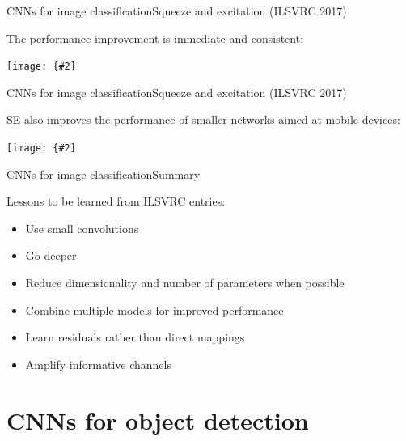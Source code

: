 \documentclass[aspectratio=169]{beamer}
\newcommand{\myfig}[3]{\centerline{\texttt{[image: \{\#2]}}}
\begin{document}
\begin{frame}{CNNs for image classification}{Squeeze and excitation (ILSVRC 2017)}

  The performance improvement is immediate and consistent:

  \medskip
  
  \myfig{4.5in}{hu-fig4}{Hu, Shen, and Sun (2018), Fig.\ 4}
  
\end{frame}


\begin{frame}{CNNs for image classification}{Squeeze and excitation (ILSVRC 2017)}

  SE also improves the performance of smaller networks aimed at mobile
  devices:

  \medskip
  
  \myfig{4in}{hu-table3}{Hu, Shen, and Sun (2018), Table 3}
  
\end{frame}


\begin{frame}{CNNs for image classification}{Summary}

  Lessons to be learned from ILSVRC entries:
  \begin{itemize}
  \item Use small convolutions
  \item Go deeper
  \item Reduce dimensionality and number of parameters when possible
  \item Combine multiple models for improved performance
  \item Learn residuals rather than direct mappings
  \item Amplify informative channels
  \end{itemize}
  
\end{frame}


\section{CNNs for object detection}
\end{document}
